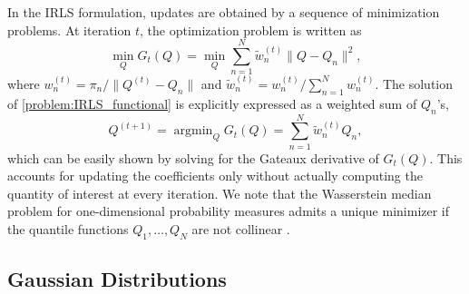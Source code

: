 \documentclass[11pt]{article}
\DeclareMathOperator*{\argmin}{argmin}
\begin{document}
In the IRLS formulation, updates are obtained by a sequence of minimization problems. At iteration $t$, the optimization problem is written as 
\begin{equation}\label{problem:IRLS_functional}
	\min_Q G_t (Q)  = \min_Q \sum_{n=1}^N \tilde{w}_n^{(t)} \|Q - Q_n\|^2, 
\end{equation}
where $w_n^{(t)} = \pi_n/\|Q^{(t)} - Q_n\|$ and $\tilde{w}_n^{(t)} = w_n^{(t)}/\sum_{n=1}^N w_n^{(t)}$. The solution of \eqref{problem:IRLS_functional} is explicitly expressed as a weighted sum of $Q_n$'s,
\begin{equation*}
	Q^{(t+1)} = \argmin_Q G_t(Q) = \sum_{n=1}^N \tilde{w}_n^{(t)} Q_n,
\end{equation*}
which can be easily shown by solving for the Gateaux derivative of $G_t (Q)$. This accounts for updating the coefficients only without actually computing the quantity of interest at every iteration. We note that the Wasserstein median problem for one-dimensional probability measures admits a unique minimizer if the quantile functions $Q_1,\ldots,Q_N$ are not collinear \citep{vardi_2000_MultivariateL1medianAssociated, minsker_2015_GeometricMedianRobust}.







\subsection{Gaussian Distributions}
\end{document}
